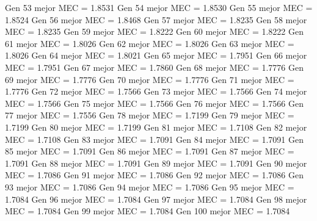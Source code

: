 Gen 53 mejor MEC = 1.8531
Gen 54 mejor MEC = 1.8530
Gen 55 mejor MEC = 1.8524
Gen 56 mejor MEC = 1.8468
Gen 57 mejor MEC = 1.8235
Gen 58 mejor MEC = 1.8235
Gen 59 mejor MEC = 1.8222
Gen 60 mejor MEC = 1.8222
Gen 61 mejor MEC = 1.8026
Gen 62 mejor MEC = 1.8026
Gen 63 mejor MEC = 1.8026
Gen 64 mejor MEC = 1.8021
Gen 65 mejor MEC = 1.7951
Gen 66 mejor MEC = 1.7951
Gen 67 mejor MEC = 1.7860
Gen 68 mejor MEC = 1.7776
Gen 69 mejor MEC = 1.7776
Gen 70 mejor MEC = 1.7776
Gen 71 mejor MEC = 1.7776
Gen 72 mejor MEC = 1.7566
Gen 73 mejor MEC = 1.7566
Gen 74 mejor MEC = 1.7566
Gen 75 mejor MEC = 1.7566
Gen 76 mejor MEC = 1.7566
Gen 77 mejor MEC = 1.7556
Gen 78 mejor MEC = 1.7199
Gen 79 mejor MEC = 1.7199
Gen 80 mejor MEC = 1.7199
Gen 81 mejor MEC = 1.7108
Gen 82 mejor MEC = 1.7108
Gen 83 mejor MEC = 1.7091
Gen 84 mejor MEC = 1.7091
Gen 85 mejor MEC = 1.7091
Gen 86 mejor MEC = 1.7091
Gen 87 mejor MEC = 1.7091
Gen 88 mejor MEC = 1.7091
Gen 89 mejor MEC = 1.7091
Gen 90 mejor MEC = 1.7086
Gen 91 mejor MEC = 1.7086
Gen 92 mejor MEC = 1.7086
Gen 93 mejor MEC = 1.7086
Gen 94 mejor MEC = 1.7086
Gen 95 mejor MEC = 1.7084
Gen 96 mejor MEC = 1.7084
Gen 97 mejor MEC = 1.7084
Gen 98 mejor MEC = 1.7084
Gen 99 mejor MEC = 1.7084
Gen 100 mejor MEC = 1.7084

